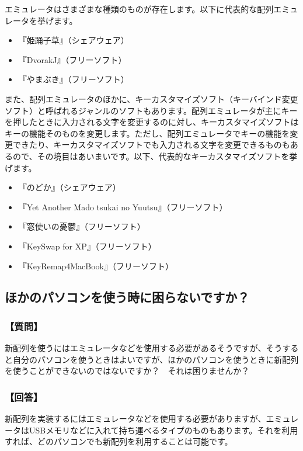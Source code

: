 エミュレータはさまざまな種類のものが存在します。以下に代表的な配列エミュレータを挙げます。

\begin{itemize}
 \item 『姫踊子草』（シェアウェア）
 \item 『DvorakJ』（フリーソフト）
 \item 『やまぶき』（フリーソフト）
\end{itemize}

また、配列エミュレータのほかに、キーカスタマイズソフト（キーバインド変更ソフト）と呼ばれるジャンルのソフトもあります。配列エミュレータが主にキーを押したときに入力される文字を変更するのに対し、キーカスタマイズソフトはキーの機能そのものを変更します。ただし、配列エミュレータでキーの機能を変更できたり、キーカスタマイズソフトでも入力される文字を変更できるものもあるので、その境目はあいまいです。以下、代表的なキーカスタマイズソフトを挙げます。

\begin{itemize}
 \item 『のどか』（シェアウェア）
 \item 『Yet Another Mado tsukai no Yuutsu』（フリーソフト）
 \item 『窓使いの憂鬱』（フリーソフト）
 \item 『KeySwap for XP』（フリーソフト）
 \item 『KeyRemap4MacBook』（フリーソフト）
\end{itemize}


\subsection{ほかのパソコンを使う時に困らないですか？}

\subsubsection*{【質問】}

新配列を使うにはエミュレータなどを使用する必要があるそうですが、そうすると自分のパソコンを使うときはよいですが、ほかのパソコンを使うときに新配列を使うことができないのではないですか？　それは困りませんか？

\subsubsection*{【回答】}

新配列を実装するにはエミュレータなどを使用する必要がありますが、エミュレータはUSBメモリなどに入れて持ち運べるタイプのものもあります。それを利用すれば、どのパソコンでも新配列を利用することは可能です。

